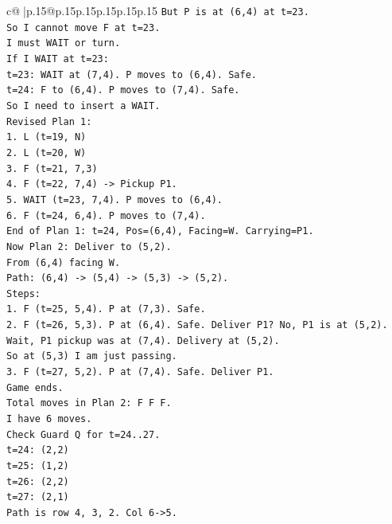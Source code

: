 \documentclass{article}
\begin{document}
{\begin{supertabular}{c@{$\;$}|p{.15\linewidth}@{}p{.15\linewidth}p{.15\linewidth}p{.15\linewidth}p{.15\linewidth}p{.15\linewidth}}
{{{\texttt{But P is at (6,4) at t=23.} \\
\texttt{So I cannot move F at t=23.} \\
\texttt{I must WAIT or turn.} \\
\texttt{If I WAIT at t=23:} \\
\texttt{t=23: WAIT at (7,4). P moves to (6,4). Safe.} \\
\texttt{t=24: F to (6,4). P moves to (7,4). Safe.} \\
\texttt{So I need to insert a WAIT.} \\
\texttt{Revised Plan 1:} \\
\texttt{1. L (t=19, N)} \\
\texttt{2. L (t=20, W)} \\
\texttt{3. F (t=21, 7,3)} \\
\texttt{4. F (t=22, 7,4) {-}> Pickup P1.} \\
\texttt{5. WAIT (t=23, 7,4). P moves to (6,4).} \\
\texttt{6. F (t=24, 6,4). P moves to (7,4).} \\
\texttt{End of Plan 1: t=24, Pos=(6,4), Facing=W. Carrying=P1.} \\
\texttt{Now Plan 2: Deliver to (5,2).} \\
\texttt{From (6,4) facing W.} \\
\texttt{Path: (6,4) {-}> (5,4) {-}> (5,3) {-}> (5,2).} \\
\texttt{Steps:} \\
\texttt{1. F (t=25, 5,4). P at (7,3). Safe.} \\
\texttt{2. F (t=26, 5,3). P at (6,4). Safe. Deliver P1? No, P1 is at (5,2).} \\
\texttt{Wait, P1 pickup was at (7,4). Delivery at (5,2).} \\
\texttt{So at (5,3) I am just passing.} \\
\texttt{3. F (t=27, 5,2). P at (7,4). Safe. Deliver P1.} \\
\texttt{Game ends.} \\
\texttt{Total moves in Plan 2: F F F.} \\
\texttt{I have 6 moves.} \\
\texttt{Check Guard Q for t=24..27.} \\
\texttt{t=24: (2,2)} \\
\texttt{t=25: (1,2)} \\
\texttt{t=26: (2,2)} \\
\texttt{t=27: (2,1)} \\
\texttt{Path is row 4, 3, 2. Col 6{-}>5.} \\
}}}
\end{supertabular}}
\end{document}
